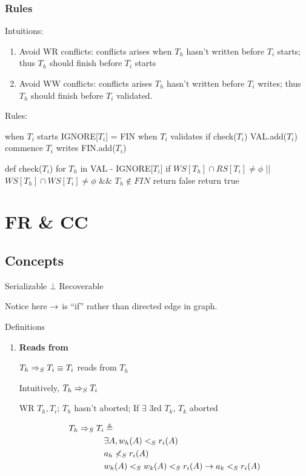 \documentclass[a4paper]{report}
\begin{document}
\subsection{Rules}
Intuitions: 
\begin{enumerate}
\item Avoid WR conflicts: conflicts arises when $T_h$ hasn't written before $T_i$ starts; thus $T_h$ should finish before $T_i$ starts 
\item Avoid WW conflicts: conflicts arises $T_h$ hasn't written before $T_i$ writes; thus $T_h$ should finish before $T_i$ validated. 
\end{enumerate}
Rules:
\begin{pseudo}
when $T_i$ starts
  IGNORE[$T_i$] = FIN
when $T_i$ validates 
  if check($T_i$)
    VAL.add($T_i$)
    commence $T_i$ writes 
    FIN.add($T_i$)
        
def check($T_i$)
  for $T_h$ in VAL - IGNORE[$T_i$]
    if $WS[T_h]\cap RS[T_i] \neq \phi$ || $WS[T_h]\cap WS[T_i] \neq \phi$ && $T_h \notin FIN$
      return false
  return true
  
\end{pseudo}
\chapter{FR \& CC}
\section{Concepts}
Serializable $\bot$ Recoverable 

Notice here $\rightarrow$ is ``if'' rather than directed edge in graph. 

Definitions
\begin{enumerate}
\item \textbf{Reads from}

$T_h \Rightarrow_S T_i \equiv T_i$ reads from $T_h$

Intuitively, $T_h \Rightarrow_S T_i$
\begin{enumerate}
\treeitem WR $T_h, T_i$;
\treeitem $T_h$ hasn't aborted; 
\treeitem If $\exists$ 3rd $T_k$, $T_k$ aborted
\end{enumerate}
\begin{align*}
T_h \Rightarrow_S T_i &\triangleq \\
& \exists A, w_h(A) <_S r_i(A) \\
& a_h \nless_S r_i(A) \\
& w_h(A) <_S w_k(A) <_S r_i(A) \rightarrow a_k <_S r_i(A)
\end{align*}



\end{enumerate}
\end{document}
